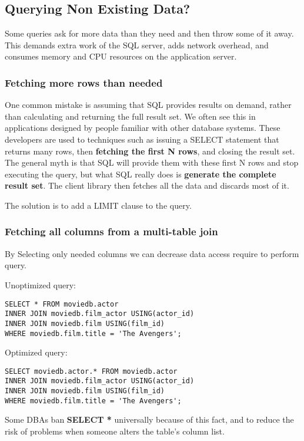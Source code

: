 \documentclass[paper=letter, fontsize=12pt]{article}
\begin{document}
\subsection{Querying Non Existing Data?}
Some queries ask for more data than they need and then throw some of it away. This demands extra work of the SQL server, adds network overhead, and consumes memory and CPU resources on the application server.
\subsubsection{Fetching more rows than needed}
One common mistake is assuming that SQL provides results on demand, rather than calculating and returning the full result set. We often see this in applications designed by people familiar with other database systems. These developers are used to techniques such as issuing a SELECT statement that returns many rows, then \textbf{fetching the first N rows}, and closing the result set. The general myth is that SQL will provide them with these first N rows and stop executing the query, but what SQL really does is \textbf{generate the complete result set}. The client library then fetches all the data and discards most of it.

The solution is to add a LIMIT clause to the query.

\subsubsection{Fetching all columns from a multi-table join}
By Selecting only needed columns we can decrease data access require to perform query.

Unoptimized query:
\begin{verbatim}
SELECT * FROM moviedb.actor
INNER JOIN moviedb.film_actor USING(actor_id)
INNER JOIN moviedb.film USING(film_id)
WHERE moviedb.film.title = 'The Avengers';
\end{verbatim}

Optimized query:
\begin{verbatim}
SELECT moviedb.actor.* FROM moviedb.actor
INNER JOIN moviedb.film_actor USING(actor_id)
INNER JOIN moviedb.film USING(film_id)
WHERE moviedb.film.title = 'The Avengers';
\end{verbatim}

Some DBAs ban \textbf{SELECT *} universally because of this fact, and to reduce the risk of problems when someone alters the table’s column list.
\end{document}

